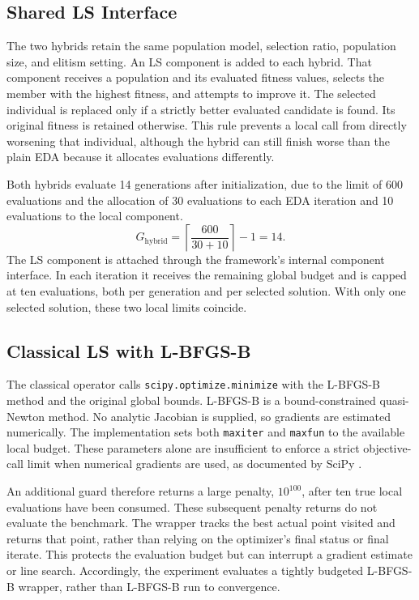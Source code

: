 \subsection{Shared LS Interface}

The two hybrids retain the same population model, selection ratio, population size, and elitism setting. An LS component is added to each hybrid. That component receives a population and its evaluated fitness values, selects the member with the highest fitness, and attempts to improve it. The selected individual is replaced only if a strictly better evaluated candidate is found. Its original fitness is retained otherwise. This rule prevents a local call from directly worsening that individual, although the hybrid can still finish worse than the plain EDA because it allocates evaluations differently.

Both hybrids evaluate 14 generations after initialization, due to the limit of 600 evaluations and the allocation of 30 evaluations to each EDA iteration and 10 evaluations to the local component.
\begin{equation}
 G_{\mathrm{hybrid}}=\left\lceil\frac{600}{30+10}\right\rceil-1=14.
\end{equation}
The LS component is attached through the framework's internal component interface. In each iteration it receives the remaining global budget and is capped at ten evaluations, both per generation and per selected solution. With only one selected solution, these two local limits coincide.

\subsection{Classical LS with L-BFGS-B}

The classical operator calls \texttt{scipy.optimize.minimize} with the L-BFGS-B method and the original global bounds. L-BFGS-B is a bound-constrained quasi-Newton method. No analytic Jacobian is supplied, so gradients are estimated numerically. The implementation sets both \texttt{maxiter} and \texttt{maxfun} to the available local budget. These parameters alone are insufficient to enforce a strict objective-call limit when numerical gradients are used, as documented by SciPy \cite{scipylbfgsb}.

An additional guard therefore returns a large penalty, $10^{100}$, after ten true local evaluations have been consumed. These subsequent penalty returns do not evaluate the benchmark. The wrapper tracks the best actual point visited and returns that point, rather than relying on the optimizer's final status or final iterate. This protects the evaluation budget but can interrupt a gradient estimate or line search. Accordingly, the experiment evaluates a tightly budgeted L-BFGS-B wrapper, rather than L-BFGS-B run to convergence.


